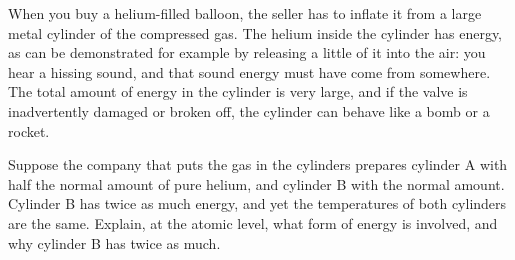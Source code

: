         When you buy a helium-filled balloon, the seller has to inflate it
        from a large metal cylinder of the compressed gas. The helium inside
        the cylinder has energy, as can be demonstrated for example by releasing
        a little of it into the air: you hear a hissing sound, and that sound
        energy must have come from somewhere. The total amount of energy in the
        cylinder is very large, and if the valve is inadvertently damaged or broken off,
        the cylinder can behave like a bomb or a rocket.
        
        Suppose the company that puts the gas in the cylinders prepares cylinder A with
        half the normal amount of pure helium, and cylinder B with the normal amount.
        Cylinder B has twice as much energy, and yet the temperatures of both cylinders
        are the same. Explain, at the atomic level, what form of energy is involved,
        and why cylinder B has twice as much.

